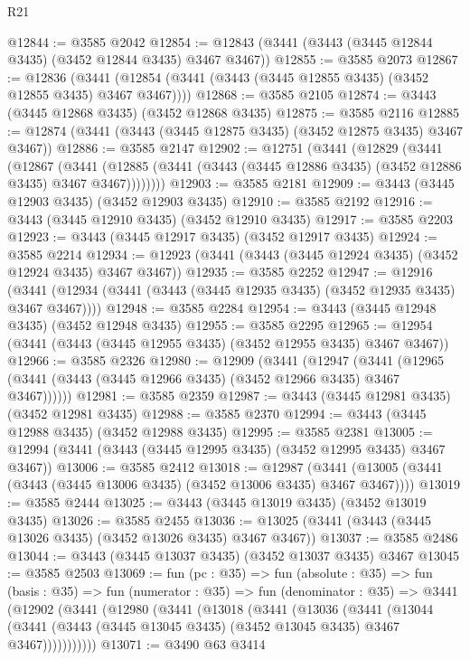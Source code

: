 \begin{lexlean}{R21}
\begin{coremodule}
@12844 := @3585 @2042
@12854 := @12843 (@3441 (@3443 (@3445 @12844 @3435) (@3452 @12844 @3435) @3467 @3467))
@12855 := @3585 @2073
@12867 := @12836
    (@3441 (@12854 (@3441 (@3443 (@3445 @12855 @3435) (@3452 @12855 @3435) @3467 @3467))))
@12868 := @3585 @2105
@12874 := @3443 (@3445 @12868 @3435) (@3452 @12868 @3435)
@12875 := @3585 @2116
@12885 := @12874 (@3441 (@3443 (@3445 @12875 @3435) (@3452 @12875 @3435) @3467 @3467))
@12886 := @3585 @2147
@12902 := @12751
    (@3441
      (@12829
        (@3441
          (@12867
            (@3441
              (@12885 (@3441 (@3443 (@3445 @12886 @3435) (@3452 @12886 @3435) @3467 @3467))))))))
@12903 := @3585 @2181
@12909 := @3443 (@3445 @12903 @3435) (@3452 @12903 @3435)
@12910 := @3585 @2192
@12916 := @3443 (@3445 @12910 @3435) (@3452 @12910 @3435)
@12917 := @3585 @2203
@12923 := @3443 (@3445 @12917 @3435) (@3452 @12917 @3435)
@12924 := @3585 @2214
@12934 := @12923 (@3441 (@3443 (@3445 @12924 @3435) (@3452 @12924 @3435) @3467 @3467))
@12935 := @3585 @2252
@12947 := @12916
    (@3441 (@12934 (@3441 (@3443 (@3445 @12935 @3435) (@3452 @12935 @3435) @3467 @3467))))
@12948 := @3585 @2284
@12954 := @3443 (@3445 @12948 @3435) (@3452 @12948 @3435)
@12955 := @3585 @2295
@12965 := @12954 (@3441 (@3443 (@3445 @12955 @3435) (@3452 @12955 @3435) @3467 @3467))
@12966 := @3585 @2326
@12980 := @12909
    (@3441
      (@12947
        (@3441 (@12965 (@3441 (@3443 (@3445 @12966 @3435) (@3452 @12966 @3435) @3467 @3467))))))
@12981 := @3585 @2359
@12987 := @3443 (@3445 @12981 @3435) (@3452 @12981 @3435)
@12988 := @3585 @2370
@12994 := @3443 (@3445 @12988 @3435) (@3452 @12988 @3435)
@12995 := @3585 @2381
@13005 := @12994 (@3441 (@3443 (@3445 @12995 @3435) (@3452 @12995 @3435) @3467 @3467))
@13006 := @3585 @2412
@13018 := @12987
    (@3441 (@13005 (@3441 (@3443 (@3445 @13006 @3435) (@3452 @13006 @3435) @3467 @3467))))
@13019 := @3585 @2444
@13025 := @3443 (@3445 @13019 @3435) (@3452 @13019 @3435)
@13026 := @3585 @2455
@13036 := @13025 (@3441 (@3443 (@3445 @13026 @3435) (@3452 @13026 @3435) @3467 @3467))
@13037 := @3585 @2486
@13044 := @3443 (@3445 @13037 @3435) (@3452 @13037 @3435) @3467
@13045 := @3585 @2503
@13069 := fun (pc : @35) =>
  fun (absolute : @35) =>
  fun (basis : @35) =>
  fun (numerator : @35) =>
  fun (denominator : @35) =>
  @3441
    (@12902
      (@3441
        (@12980
          (@3441
            (@13018
              (@3441
                (@13036
                  (@3441
                    (@13044
                      (@3441 (@3443 (@3445 @13045 @3435) (@3452 @13045 @3435) @3467 @3467)))))))))))
@13071 := @3490 @63 @3414

\end{coremodule}
\end{lexlean}
